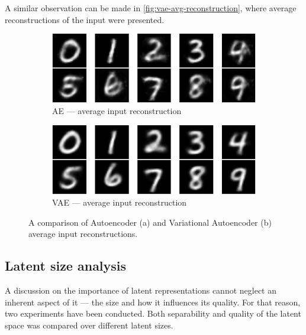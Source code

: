 \vspace{\baselineskip}
A similar observation can be made in \autoref{fig:vae-avg-reconstruction}, where average reconstructions of the input were presented. 

\begin{figure}[]
     \centering
     \begin{subfigure}[b]{0.45\textwidth}
         \centering
         \includegraphics[width=\textwidth]{observational/img/vae/ae_avg_reconstruction.png}
         \caption{AE — average input reconstruction}
     \end{subfigure} 
     \hfill
     \begin{subfigure}[b]{0.45\textwidth}
          \includegraphics[width=\textwidth]{observational/img/vae/vae_avg_reconstruction.png}
         \caption{VAE — average input reconstruction}
     \end{subfigure} 
     \caption[Comparison of AE and VAE average input reconstructions]{A comparison of Autoencoder (a) and Variational Autoencoder (b) average input reconstructions.}
    \label{fig:vae-avg-reconstruction}
\end{figure}


\subsection{Latent size analysis}
A discussion on the importance of latent representations cannot neglect an inherent aspect of it — the size and how it influences its quality. For that reason, two experiments have been conducted. Both separability and quality of the latent space was compared over different latent sizes.

